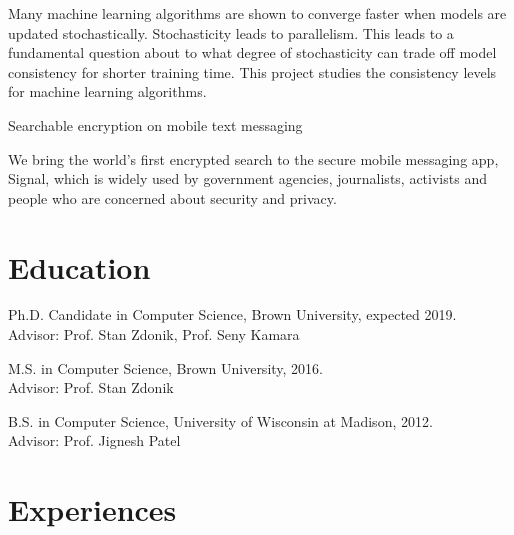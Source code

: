\documentclass[letterpaper]{article}
\renewenvironment{itemize}{
  \begin{list}{}{
    \setlength{\leftmargin}{1.5em}
  }
}{
  \end{list}
}
\begin{document}
\begin{itemize}
\begin{itemize}
			\item Many machine learning algorithms are shown to converge faster when models are updated stochastically.  Stochasticity leads to parallelism.  This leads to a fundamental question about to what degree of stochasticity can trade off model consistency for shorter training time.  This project studies the consistency levels for machine learning algorithms.
		\end{itemize}
	\item Searchable encryption on mobile text messaging
		\begin{itemize}
			\item We bring the world's first encrypted search to the secure mobile messaging app, Signal, which is widely used by government agencies, journalists, activists and people who are concerned about security and privacy.
		\end{itemize}
\end{itemize}

\section*{Education}

\begin{itemize}
  \item Ph.D. Candidate in Computer Science, Brown University, expected 2019.\\
  Advisor: Prof. Stan Zdonik, Prof. Seny Kamara
  \item M.S. in Computer Science, Brown University, 2016.\\
  Advisor: Prof. Stan Zdonik
  \item B.S. in Computer Science, University of Wisconsin at Madison, 2012.\\
  Advisor: Prof. Jignesh Patel
\end{itemize}


\section*{Experiences}
\end{document}
